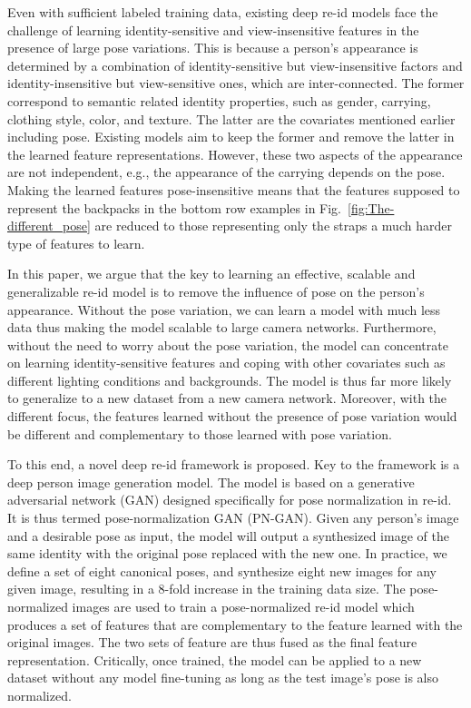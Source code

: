 \documentclass[10pt,letterpaper,twocolumn,10pt,letterpaper,twocolumn]{article}
\begin{document}
Even with sufficient labeled training data, existing deep re-id models
face the challenge of learning identity-sensitive and view-insensitive
features in the presence of large pose variations. This is because
a person's appearance is determined by a combination of identity-sensitive
but view-insensitive factors and identity-insensitive but view-sensitive
ones, which are inter-connected. The former correspond to semantic
related identity properties, such as gender, carrying, clothing style,
color, and texture. The latter are the covariates mentioned earlier
including pose. Existing models aim to keep the former and remove
the latter in the learned feature representations. However, these
two aspects of the appearance are not independent, e.g., the appearance
of the carrying depends on the pose. Making the learned features pose-insensitive
means that the features supposed to represent the backpacks in the
bottom row examples in Fig.~\ref{fig:The-different_pose} are reduced
to those representing only the straps \textendash{} a much harder
type of features to learn.

In this paper, we argue that the key to learning an effective, scalable
and generalizable re-id model is to remove the influence of pose on
the person's appearance. Without the pose variation, we can learn
a model with much less data thus making the model scalable to large
camera networks. Furthermore, without the need to worry about the
pose variation, the model can concentrate on learning identity-sensitive
features and coping with other covariates such as different lighting
conditions and backgrounds. The model is thus far more likely to generalize
to a new dataset from a new camera network. Moreover, with the different
focus, the features learned without the presence of pose variation
would be different and complementary to those learned with pose variation.

To this end, a novel deep re-id framework is proposed. Key to the
framework is a deep person image generation model. The model is based
on a generative adversarial network (GAN) designed specifically for
pose normalization in re-id. It is thus termed pose-normalization GAN (PN-GAN).
Given any person's image and a desirable pose as input, the model
will output a synthesized image of the same identity with the original
pose replaced with the new one. In practice, we define a set of eight
canonical poses, and synthesize eight new images for any given image,
resulting in a 8-fold increase in the training data size. The pose-normalized
images are used to train a pose-normalized re-id model which produces
a set of features that are complementary to the feature learned with
the original images. The two sets of feature are thus fused as the final feature representation.
Critically, once trained, the model can be applied to a new dataset
without any model fine-tuning as long as the test image's pose is
also normalized.
\end{document}
